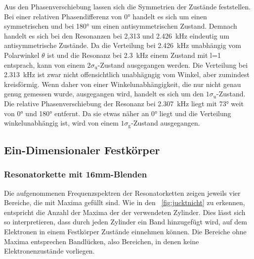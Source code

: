             Aus den Phasenverschiebung lassen sich die Symmetrien der Zustände feststellen. Bei einer relativen Phasendifferenz von 0° handelt es sich um einen symmetrischen und bei 180° um einen 
            antisymmetrischen Zustand. Demnach handelt es sich bei den Resonanzen bei 2,313 und \SI{2.426}{\kilo\hertz} eindeutig um antisymmetrische Zustände. Da die Verteilung bei \SI{2.426}{\kilo\hertz} 
            unabhängig vom Polarwinkel $\theta$ ist und die Resonanz bei \SI{2.3}{\kilo\hertz} einem Zustand mit l=1 entsprach, kann von einem $2\sigma_{\text{u}}$-Zustand ausgegangen werden. Die Verteilung 
            bei \SI{2.313}{\kilo\hertz} ist zwar nicht offensichtlich unabhägngig vom Winkel, aber zumindest kreisförmig. Wenn daher von einer Winkelunabhängigkeit, die nur nicht genau genug gemessen wurde, 
            ausgegangen wird, handelt es sich um den $1\sigma_{\text{u}}$-Zustand. Die relative Phasenverschiebung der Resonanz bei \SI{2.307}{\kilo\hertz} liegt mit 73° weit von 0° und 180° 
            entfernt. Da sie etwas näher an 0° liegt und die Verteilung winkelunabhängig ist, wird von einem $1\sigma_{\text{g}}$-Zustand ausgegangen. 

    \newpage
    \subsection{Ein-Dimensionaler Festkörper}
        \subsubsection*{Resonatorkette mit 16mm-Blenden}
            Die aufgenommenen Frequenzspektren der Resonatorketten zeigen jeweils vier Bereiche, die mit Maxima gefüllt sind. Wie in den 
            ~\autoref{fig:jucktnicht} zu erkennen, entspricht die Anzahl der Maxima der der verwendeten Zylinder. Dies lässt sich so 
            interpretieren, dass durch jeden Zylinder ein Band hinzugefügt wird, auf dem Elektronen in einem Festkörper Zustände einnehmen können. Die Bereiche ohne Maxima entsprechen Bandlücken, also Bereichen,
            in denen keine Elektronenzustände vorliegen.     
            
